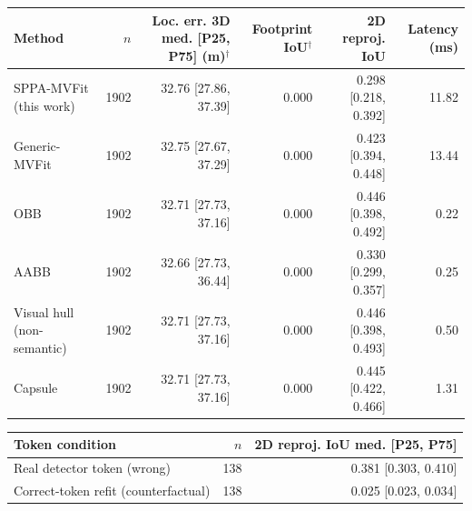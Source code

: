 \begin{tabular}{@{}lrrrrr@{}}
\toprule
Method & $n$ & Loc. err. 3D med. [P25, P75] (m)$^{\dagger}$ & Footprint IoU$^{\dagger}$ & 2D reproj. IoU & Latency (ms) \\
\midrule
SPPA-MVFit (this work) & 1902 & 32.76 [27.86, 37.39] & 0.000 & 0.298 [0.218, 0.392] & 11.82 \\
Generic-MVFit & 1902 & 32.75 [27.67, 37.29] & 0.000 & 0.423 [0.394, 0.448] & 13.44 \\
OBB & 1902 & 32.71 [27.73, 37.16] & 0.000 & 0.446 [0.398, 0.492] & 0.22 \\
AABB & 1902 & 32.66 [27.73, 36.44] & 0.000 & 0.330 [0.299, 0.357] & 0.25 \\
Visual hull (non-semantic) & 1902 & 32.71 [27.73, 37.16] & 0.000 & 0.446 [0.398, 0.493] & 0.50 \\
Capsule & 1902 & 32.71 [27.73, 37.16] & 0.000 & 0.445 [0.422, 0.466] & 1.31 \\
\bottomrule
\end{tabular}

\begin{tabular}{@{}lrr@{}}
\toprule
Token condition & $n$ & 2D reproj. IoU med. [P25, P75] \\
\midrule
Real detector token (wrong) & 138 & 0.381 [0.303, 0.410] \\
Correct-token refit (counterfactual) & 138 & 0.025 [0.023, 0.034] \\
\bottomrule
\end{tabular}
